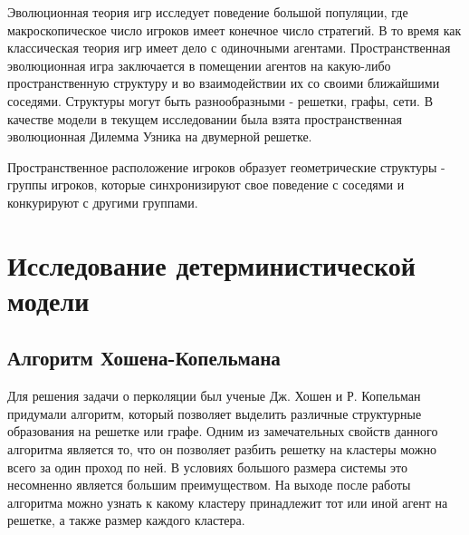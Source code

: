 \documentclass[a4paper]{article}
\begin{document}
	\par Эволюционная теория игр исследует поведение большой популяции, где макроскопическое
	число игроков имеет конечное число стратегий. В то время как классическая теория игр имеет дело с одиночными агентами. Пространственная эволюционная игра заключается в помещении агентов на какую-либо пространственную структуру и во взаимодействии их со своими ближайшими соседями. Структуры могут быть разнообразными - решетки, графы, сети. В качестве модели в текущем исследовании была взята пространственная эволюционная Дилемма Узника на двумерной решетке.
	
	\par Пространственное расположение игроков образует геометрические структуры - группы игроков, которые синхронизируют свое поведение с соседями и конкурируют с другими группами.
	 
	\section{Исследование детерминистической модели}
	
	\subsection{Алгоритм Хошена-Копельмана}
	
	\par Для решения задачи о перколяции был ученые Дж. Хошен и Р. Копельман придумали алгоритм, который позволяет выделить различные структурные образования на решетке или графе\cite{hk76}. Одним из замечательных свойств данного алгоритма является то, что он позволяет разбить решетку на кластеры можно всего за один проход по ней. В условиях большого размера системы это несомненно является большим преимуществом. На выходе после работы алгоритма можно узнать к какому кластеру принадлежит тот или иной агент на решетке, а также размер каждого кластера.
	
\end{document}
